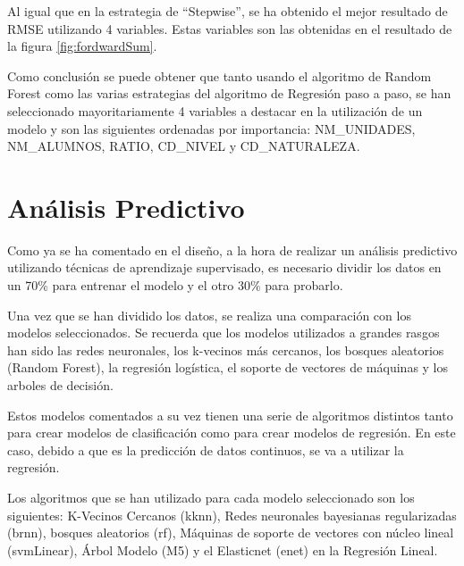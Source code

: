 \begin{subappendices}
Al igual que en la estrategia de ``Stepwise'', se ha obtenido el mejor resultado de RMSE utilizando 4 variables. Estas variables son las obtenidas en el resultado de la figura \ref{fig:fordwardSum}.	

Como conclusión se puede obtener que tanto usando el algoritmo de Random Forest como las varias estrategias del algoritmo de Regresión paso a paso, se han seleccionado mayoritariamente 4 variables a destacar en la utilización de un modelo y son las siguientes ordenadas por importancia: NM\_UNIDADES, NM\_ALUMNOS, RATIO, CD\_NIVEL y CD\_NATURALEZA. 
\end{subappendices}



\chapter{Análisis Predictivo}
\setcounter{figure}{0} \renewcommand{\thefigure}{B.\arabic{figure}}
\setcounter{table}{0} \renewcommand{\thetable}{B.\arabic{table}}

Como ya se ha comentado en el diseño, a la hora de realizar un análisis predictivo utilizando técnicas de aprendizaje supervisado, es necesario dividir los datos en un 70\% para entrenar el modelo y el otro 30\% para probarlo.

Una vez que se han dividido los datos, se realiza una comparación con los modelos seleccionados. Se recuerda que los modelos utilizados a grandes rasgos han sido las redes neuronales, los k-vecinos más cercanos, los bosques aleatorios (Random Forest), la regresión logística, el soporte de vectores de máquinas y los arboles de decisión.

Estos modelos comentados a su vez tienen una serie de algoritmos distintos tanto para crear modelos de clasificación como para crear modelos de regresión. En este caso, debido a que es la predicción de datos continuos, se va a utilizar la regresión.

Los algoritmos que se han utilizado para cada modelo seleccionado son los siguientes: K-Vecinos Cercanos (kknn), Redes neuronales bayesianas regularizadas (brnn), bosques aleatorios (rf), Máquinas de soporte de vectores con núcleo lineal (svmLinear), Árbol Modelo (M5) y el Elasticnet (enet) en la Regresión Lineal.

